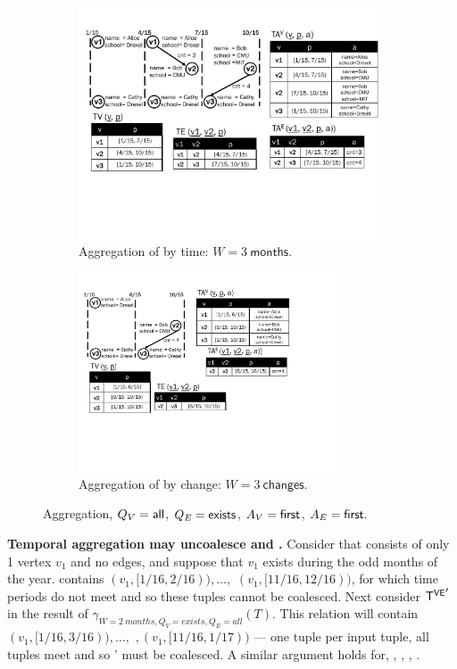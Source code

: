 \begin{figure}[t]
\begin{subfigure}[b]{0.5\textwidth}
\includegraphics[width=3.5in]{figs/agg1.pdf}
\caption{Aggregation of  by time:
  $W=3~\textsf{months}$.}
\vspace{-0.2cm}
\label{fig:tg_agg1}
\end{subfigure}
\begin{subfigure}[b]{0.4\textwidth}
\includegraphics[width=3in]{figs/agg2.pdf}
\caption{Aggregation of  by change:
  $W=3~\textsf{changes}$.}
\vspace{-0.2cm}
\label{fig:tg_agg2}
\end{subfigure}
\caption[]{Aggregation, $Q_V=\textsf{all}$, $Q_E=\textsf{exists}$,
  $A_V=\textsf{first}$, $A_E=\textsf{first}.$}
\label{fig:tg_agg}
\vspace{-0.5cm}
\end{figure}

{\bf Temporal aggregation may uncoalesce \tve and \trg.}  Consider
 that consists of only 1 vertex $v_1$ and no edges, and
suppose that $v_1$ exists during the odd months of the year.  \tv
contains $(v_1, [1/16, 2/16)), \ldots,$ $(v_1, [11/16,12/16))$, for
    which time periods do not meet and so these tuples cannot be
    coalesced.  Next consider $\mathsf{T^{VE}}'$ in the result of
    $\gamma_{W=2~months, Q_V=exists,Q_E=all}(T)$.  This relation will
    contain $(v_1, [1/16, 3/16)), \ldots,$ $,(v_1, [11/16,1/17))$ ---
        one tuple per input tuple, all tuples meet and so \tv' must be
        coalesced.  A similar argument holds for, \te, \tav, \tae,
        \trg.

